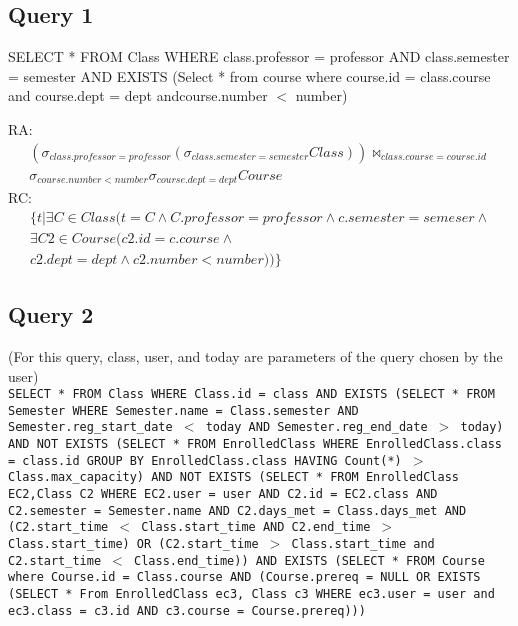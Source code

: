 \documentclass[11pt,oneside,a4paper]{article}
\begin{document}
\subsection{Query 1}
 SELECT * FROM Class WHERE class.professor = professor AND class.semester =
 semester AND EXISTS (Select * from course where course.id = class.course and
 course.dept = dept andcourse.number $<$ number) 

RA: 
\begin{align*}(\sigma_{class.professor = professor} (\sigma_{class.semester = semester}
Class)) \bowtie_{class.course = course.id} \\
\sigma_{course.number < number}
\sigma_{course.dept = dept} Course 
\end{align*}
RC: 
\begin{align*} \{t | \exists C \in Class ( t = C \wedge C.professor = professor \wedge
c.semester = semeser \wedge \\
\exists C2 \in Course ( c2.id = c.course \wedge \\
c2.dept = dept \wedge c2.number < number))\}\end{align*}

\subsection{Query 2}
(For this query, class, user, and today are parameters of the query chosen by
the user) \\

\texttt{SELECT * FROM Class WHERE Class.id = class AND EXISTS (SELECT * FROM
Semester WHERE Semester.name = Class.semester AND Semester.reg\_start\_date $<$
today AND Semester.reg\_end\_date $>$ today) AND NOT EXISTS (SELECT * FROM
EnrolledClass WHERE EnrolledClass.class = class.id GROUP BY EnrolledClass.class
HAVING Count(*) $>$ Class.max\_capacity) AND NOT EXISTS (SELECT * FROM
EnrolledClass EC2,Class C2 WHERE EC2.user = user AND C2.id = EC2.class AND
C2.semester = Semester.name AND C2.days\_met = Class.days\_met AND
(C2.start\_time $<$ Class.start\_time AND C2.end\_time $>$ Class.start\_time)
OR (C2.start\_time $>$ Class.start\_time and C2.start\_time $<$
Class.end\_time)) AND EXISTS (SELECT * FROM Course where Course.id =
Class.course AND (Course.prereq = NULL OR EXISTS (SELECT * From EnrolledClass
ec3, Class c3 WHERE ec3.user = user and ec3.class = c3.id AND c3.course =
Course.prereq)))} 
\end{document}
